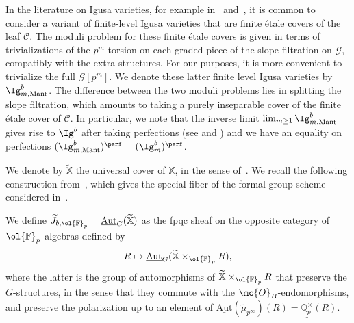 \documentclass[letterpaper,11pt]{amsart}
\begin{document}
  \begin{remark}\label{rem: comparison with Mantovan} In the literature on Igusa varieties, for example in~\cite{mantovan-PEL} and~\cite{CS17}, it is common to consider a variant of finite-level Igusa varieties that are finite \'etale covers of the leaf $\mathscr{C}$. The moduli problem for these finite \'etale covers is given in terms of trivializations of the $p^m$-torsion on each graded piece of the slope filtration on $\mathscr{G}$, compatibly with the extra structures. For our purposes, it is more convenient to trivialize the full $\mathscr{G}[p^m]$. We denote these latter finite level Igusa varieties by $\Ig^{b}_{m,\mathrm{Mant}}$. The difference between the two moduli problems lies in splitting the slope filtration, which amounts to taking a purely inseparable cover of the finite \'etale cover of $\mathscr{C}$. In particular, we note that the inverse limit $\lim_{m \geq 1} \Ig^{b}_{m,\mathrm{Mant}}$ gives rise to $\Ig^{b}$ after taking perfections (see \cite[Remark~2.3.7.]{CS2} and \cite[Proposition~4.3.8]{CS17}) and we have an equality on perfections $(\Ig^{b}_{m,\mathrm{Mant}})^{\perf} = (\Ig^{b}_{m})^{\perf}$.
  \end{remark}

We denote by $\widetilde{\mathbb{X}}$ the universal cover of $\mathbb{X}$, in the sense of~\cite[\S 3.1]{Scholze-Weinstein}. We recall the following construction from~\cite[Definition 9.15]{zhang2023}, which gives the special fiber of the formal group scheme considered in~\cite[Definition 4.2.9]{CS17}. 

\begin{definition}{\label{defn: automorphismsfpqcsheaf}}
 We define $\widetilde{J}_{b, \ol{\mathbb{F}}_p}=\underline{\mathrm{Aut}}_{G}(\widetilde{\mathbb{X}})$ as the fpqc sheaf on the opposite category of $\ol{\mathbb{F}}_p$-algebras defined by 
 \[
 R\mapsto \underline{\mathrm{Aut}}_G(\widetilde{\mathbb{X}}\times_{\ol{\mathbb{F}}_p} R),
 \]
 where the latter is the group of automorphisms of $\widetilde{\mathbb{X}}\times_{\ol{\mathbb{F}}_p} R$ that preserve the $G$-structures, in the sense that they commute with the $\mc{O}_B$-endomorphisms, and preserve the polarization up to an element of $\underline{\mathrm{Aut}}(\tilde{\mu}_{p^\infty})(R)= \underline{\mathbb{Q}^\times_p}(R)$. 
\end{definition}
\end{document}
